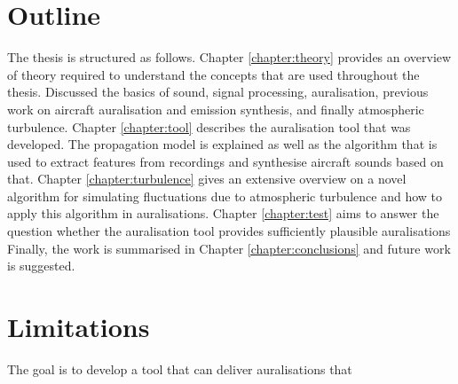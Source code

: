 \section{Outline}
The thesis is structured as follows.
\newline
\newline
Chapter \ref{chapter:theory} provides an overview of theory required to understand the concepts that are used throughout the thesis.
Discussed the basics of sound, signal processing, auralisation, previous work on aircraft auralisation and emission synthesis, and finally atmospheric turbulence.
\newline
\newline
Chapter \ref{chapter:tool} describes the auralisation tool that was developed. The propagation model is explained as well as the algorithm that is used to extract features from recordings and synthesise aircraft sounds based on that.
\newline
\newline
Chapter \ref{chapter:turbulence} gives an extensive overview on a novel algorithm for simulating fluctuations due to atmospheric turbulence and how to apply this algorithm in auralisations.
\newline
\newline
Chapter \ref{chapter:test} aims to answer the question whether the auralisation tool provides sufficiently plausible auralisations
\newline
\newline
Finally, the work is summarised in Chapter \ref{chapter:conclusions} and future work is suggested.


\section{Limitations}
The goal is to develop a tool that can deliver auralisations that 


